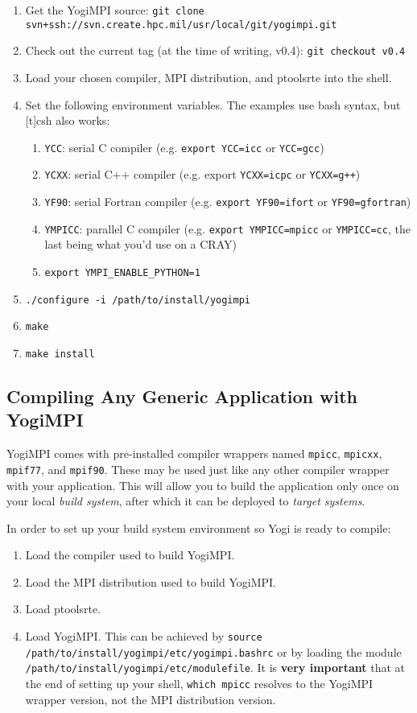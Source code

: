 \documentclass{article}
\begin{document}
\begin{enumerate}
\item Get the YogiMPI source: \texttt{git clone svn+ssh://svn.create.hpc.mil/usr/local/git/yogimpi.git}
\item Check out the current tag (at the time of writing, v0.4): \texttt{git checkout v0.4}
\item Load your chosen compiler, MPI distribution, and ptoolsrte into the shell.
\item Set the following environment variables.  The examples use bash syntax, but [t]csh also works:
\begin{enumerate}
\item \texttt{YCC}: serial C compiler (e.g. \texttt{export YCC=icc} or \texttt{YCC=gcc})
\item \texttt{YCXX}: serial C++ compiler (e.g. export \texttt{YCXX=icpc} or \texttt{YCXX=g++})
\item \texttt{YF90}: serial Fortran compiler (e.g. \texttt{export YF90=ifort} or \texttt{YF90=gfortran})
\item \texttt{YMPICC}: parallel C compiler (e.g. \texttt{export YMPICC=mpicc} or \texttt{YMPICC=cc}, the last being what you'd use on a CRAY)
\item \texttt{export YMPI\_ENABLE\_PYTHON=1}
\end{enumerate}
\item \texttt{./configure -i /path/to/install/yogimpi}
\item \texttt{make}
\item \texttt{make install}
\end{enumerate}

\subsection{Compiling Any Generic Application with YogiMPI}
\label{generic:compile}
YogiMPI comes with pre-installed compiler wrappers named \texttt{mpicc}, \texttt{mpicxx}, \texttt{mpif77}, and \texttt{mpif90}.  These may be used just like any other compiler wrapper with your application.  This will allow you to build the application only once on your local \textit{build system}, after which it can be deployed to \textit{target systems}.

In order to set up your build system environment so Yogi is ready to compile:

\begin{enumerate}
\item Load the compiler used to build YogiMPI.
\item Load the MPI distribution used to build YogiMPI.
\item Load ptoolsrte.
\item Load YogiMPI.  This can be achieved by \texttt{source /path/to/install/yogimpi/etc/yogimpi.bashrc} or by loading the module \texttt{/path/to/install/yogimpi/etc/modulefile}.  It is \textbf{very important} that at the end of setting up your shell, \texttt{which mpicc} resolves to the YogiMPI wrapper version, not the MPI distribution version.
\end{enumerate}
\end{document}
